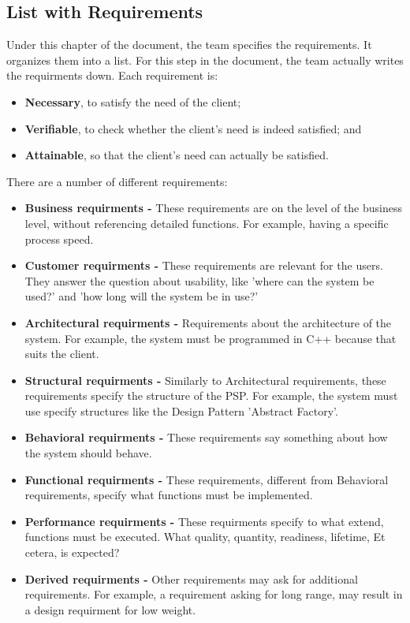 \documentclass[10pt]{report}
\begin{document}
\subsection{List with Requirements}

Under this chapter of the document, the team specifies the requirements. It organizes them into a list. For this step in the document, the team actually writes the requirments down. Each requirement is:

\begin{itemize}
	\item \textbf{Necessary}, to satisfy the need of the client;
	\item \textbf{Verifiable}, to check whether the client's need is indeed satisfied; and
	\item \textbf{Attainable}, so that the client's need can actually be satisfied. 
\end{itemize}

There are a number of different requirements:

\begin{itemize}
	\item \textbf{Business requirments -} These requirements are on the level of the business level, without referencing detailed functions. For example, having a specific process speed.
	\item \textbf{Customer requirments -} These requirements are relevant for the users. They answer the question about usability, like 'where can the system be used?' and 'how long will the system be in use?'
	\item \textbf{Architectural requirments -} Requirements about the architecture of the system. For example, the system must be programmed in C++ because that suits the client.
	\item \textbf{Structural requirments -} Similarly to Architectural requirements, these requirements specify the structure of the PSP. For example, the system must use specify structures like the Design Pattern 'Abstract Factory'.
	\item \textbf{Behavioral requirments -} These requirements say something about how the system should behave.
	\item \textbf{Functional requirments -} These requirements, different from Behavioral requirements, specify what functions must be implemented.
	\item \textbf{Performance requirments -} These requirments specify to what extend, functions must be executed. What quality, quantity, readiness, lifetime, Et cetera, is expected?
	\item \textbf{Derived requirments -} Other requirements may ask for additional requirements. For example, a requirement asking for long range, may result in a design requirment for low weight.
\end{itemize}
\end{document}
